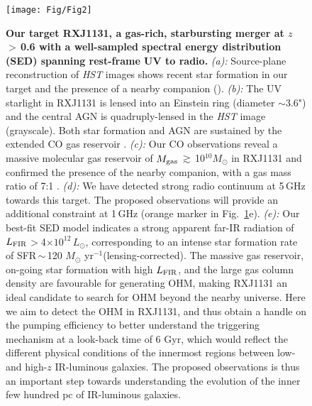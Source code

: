 \documentclass[letterpaper,11pt]{article}
\newcommand{\Lsun}{\mbox{$L_{\odot}$}\xspace}
\newcommand{\Msun}{\mbox{$M_{\odot}$}\xspace}
\newcommand{\LFIR}{\mbox{$L_{\rm FIR}$}\xspace}
\newcommand{\pmOne}{\mbox{$^{-1}$}\xspace}
\newcommand{\Fig}[1]{Fig.~\ref{fig:#1}}
\newcommand{\E}[1]{\mbox{$\times10^{#1}$}}
\newcommand{\ssim}{\,$\sim$\,}
\newcommand{\obs}{observations\xspace}
\begin{document}
\begin{figure}[ptbh]
\centering
\texttt{[image: Fig/Fig2]}
\vspace{-0.25em}
\caption{
{\bf Our target RXJ1131, a gas-rich, starbursting merger at $z$\,$>$\,0.6 with a well-sampled spectral energy distribution (SED) spanning rest-frame UV to radio.}
{\em (a):} Source-plane reconstruction of {\it HST} images shows recent star formation in our target and
the presence of a nearby companion (\citealt{Claeskens06a}).
{\em (b):}
The UV starlight in RXJ1131 is lensed into an Einstein ring (diameter $\sim$3.6") and the central AGN is
quadruply-lensed in the {\it HST} image (grayscale). Both star formation and AGN are sustained
by the extended CO gas reservoir \citep[contours; ][]{Leung17a}.
{\em (c):}
Our CO \obs reveal a massive molecular gas reservoir of $M_{\rm gas}$\,$\gtrsim$\,10$^{10}$\Msun in RXJ1131 and
confirmed the presence of the nearby companion, with a gas mass ratio of 7:1 \citep{Leung17a}.
{\em (d):}
We have detected strong radio continuum at 5\,GHz towards this target.
The proposed \obs will provide an additional constraint at 1\,GHz (orange marker in \Fig{hst}e).
{\em (e):} Our best-fit SED model indicates a strong apparent far-IR radiation of \LFIR$>$4\E{12}\,\Lsun, corresponding to
an intense star formation rate of SFR\ssim120 \Msun yr\pmOne (lensing-corrected).
The massive gas reservoir, on-going star formation with high \LFIR, and the large gas column density
are favourable for generating OHM, making RXJ1131 an
ideal candidate to search for OHM beyond the nearby universe.
Here we aim to detect the OHM in RXJ1131, and thus obtain a handle on the pumping efficiency
to better understand the triggering mechanism at a look-back time of 6 Gyr, which
would reflect the different physical conditions of the innermost regions between low- and high-$z$ IR-luminous galaxies.
The proposed \obs is thus an important step towards understanding the evolution of the inner few hundred pc of
IR-luminous galaxies.
\label{fig:hst}}
\end{figure}
\end{document}
